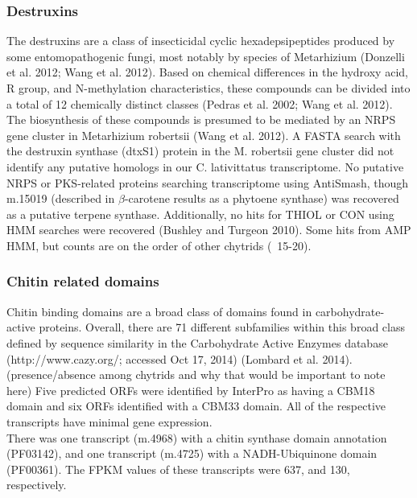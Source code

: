 \subsubsection*{Destruxins}
 The destruxins are a class of insecticidal cyclic hexadepsipeptides produced by some entomopathogenic fungi, most notably by species of Metarhizium (Donzelli et al. 2012; Wang et al. 2012). Based on chemical differences in the hydroxy acid, R group, and N-methylation characteristics, these compounds can be divided into a total of 12 chemically distinct classes (Pedras et al. 2002; Wang et al. 2012). The biosynthesis of these compounds is presumed to be mediated by an NRPS gene cluster in Metarhizium robertsii (Wang et al. 2012). A FASTA search with the destruxin synthase (dtxS1) protein in the M. robertsii gene cluster did not identify any putative homologs in our C. lativittatus transcriptome. No putative NRPS or PKS-related proteins searching transcriptome using AntiSmash, though m.15019 (described in $\beta$-carotene results as a phytoene synthase) was recovered as a putative terpene synthase. Additionally, no hits for THIOL or CON using HMM searches were recovered (Bushley and Turgeon 2010). Some hits from AMP HMM, but counts are on the order of other chytrids (~15-20).
\subsubsection*{Chitin related domains}
Chitin binding domains are a broad class of domains found in carbohydrate-active proteins. Overall, there are 71 different subfamilies within this broad class defined by sequence similarity in the Carbohydrate Active Enzymes database (http://www.cazy.org/; accessed Oct 17, 2014) (Lombard et al. 2014). (presence/absence among chytrids and why that would be important to note here) Five predicted ORFs were identified by InterPro as having a CBM18 domain and six ORFs identified with a CBM33 domain. All of the respective transcripts have minimal gene expression. \\
\indent There was one transcript (m.4968) with a chitin synthase domain annotation (PF03142), and one transcript (m.4725) with a NADH-Ubiquinone domain (PF00361). The FPKM values of these transcripts were 637, and 130, respectively.

